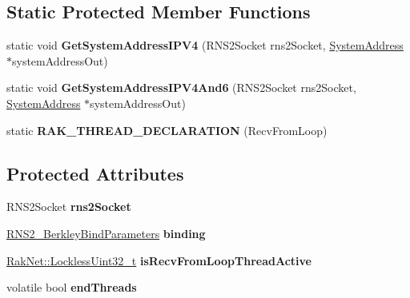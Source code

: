 \subsection*{Static Protected Member Functions}
\begin{DoxyCompactItemize}
\item 
\hypertarget{class_rak_net_1_1_r_n_s2___berkley_a5f133009e1a8f44a36f6eb18a375e8a2}{static void {\bfseries Get\-System\-Address\-I\-P\-V4} (R\-N\-S2\-Socket rns2\-Socket, \hyperlink{struct_rak_net_1_1_system_address}{System\-Address} $\ast$system\-Address\-Out)}\label{class_rak_net_1_1_r_n_s2___berkley_a5f133009e1a8f44a36f6eb18a375e8a2}

\item 
\hypertarget{class_rak_net_1_1_r_n_s2___berkley_a1f1b4d90a113fd2011db1589e03d2944}{static void {\bfseries Get\-System\-Address\-I\-P\-V4\-And6} (R\-N\-S2\-Socket rns2\-Socket, \hyperlink{struct_rak_net_1_1_system_address}{System\-Address} $\ast$system\-Address\-Out)}\label{class_rak_net_1_1_r_n_s2___berkley_a1f1b4d90a113fd2011db1589e03d2944}

\item 
\hypertarget{class_rak_net_1_1_r_n_s2___berkley_a56b832dec9538cd8a9878380c5a947d3}{static {\bfseries R\-A\-K\-\_\-\-T\-H\-R\-E\-A\-D\-\_\-\-D\-E\-C\-L\-A\-R\-A\-T\-I\-O\-N} (Recv\-From\-Loop)}\label{class_rak_net_1_1_r_n_s2___berkley_a56b832dec9538cd8a9878380c5a947d3}

\end{DoxyCompactItemize}
\subsection*{Protected Attributes}
\begin{DoxyCompactItemize}
\item 
\hypertarget{class_rak_net_1_1_r_n_s2___berkley_a06a9181ba5703bce28f208506a55bbe2}{R\-N\-S2\-Socket {\bfseries rns2\-Socket}}\label{class_rak_net_1_1_r_n_s2___berkley_a06a9181ba5703bce28f208506a55bbe2}

\item 
\hypertarget{class_rak_net_1_1_r_n_s2___berkley_af5be9d87e4bac31b610e694b3db74120}{\hyperlink{struct_rak_net_1_1_r_n_s2___berkley_bind_parameters}{R\-N\-S2\-\_\-\-Berkley\-Bind\-Parameters} {\bfseries binding}}\label{class_rak_net_1_1_r_n_s2___berkley_af5be9d87e4bac31b610e694b3db74120}

\item 
\hypertarget{class_rak_net_1_1_r_n_s2___berkley_aa147148bb52185d58db8feda7404696b}{\hyperlink{class_rak_net_1_1_lockless_uint32__t}{Rak\-Net\-::\-Lockless\-Uint32\-\_\-t} {\bfseries is\-Recv\-From\-Loop\-Thread\-Active}}\label{class_rak_net_1_1_r_n_s2___berkley_aa147148bb52185d58db8feda7404696b}

\item 
\hypertarget{class_rak_net_1_1_r_n_s2___berkley_ab727898825488f03139125a96ef508d8}{volatile bool {\bfseries end\-Threads}}\label{class_rak_net_1_1_r_n_s2___berkley_ab727898825488f03139125a96ef508d8}

\end{DoxyCompactItemize}
